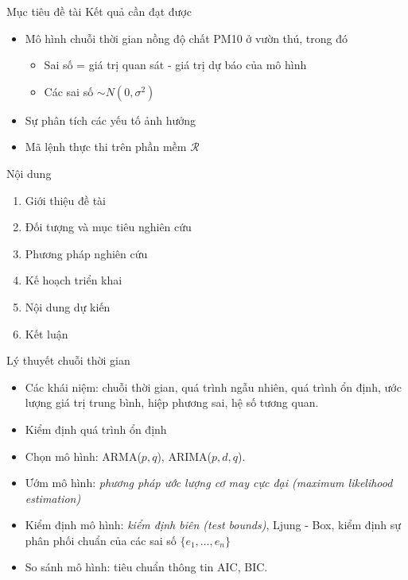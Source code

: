 \documentclass{beamer}
\begin{document}
\begin{frame}{Mục tiêu đề tài}
Kết quả cần đạt được
\begin{itemize}
\item Mô hình chuỗi thời gian nồng độ chất PM10 ở vườn thú, trong đó
	\begin{itemize}
	\item Sai số = giá trị quan sát - giá trị dự báo của mô hình
	\item Các sai số \(\sim N(0, \sigma^2)\)
	\end{itemize}
\item Sự phân tích các yếu tố ảnh hưởng
\item Mã lệnh thực thi trên phần mềm \(\mathcal{R}\)
\end{itemize}
\end{frame}

\begin{frame}{Nội dung}
\begin{enumerate}
\item Giới thiệu đề tài
\item Đối tượng và mục tiêu nghiên cứu
\item {\color{red}Phương pháp nghiên cứu}
\item Kế hoạch triển khai
\item Nội dung dự kiến
\item Kết luận
\end{enumerate}
\end{frame}

\begin{frame}{Lý thuyết chuỗi thời gian}
\begin{itemize}
\item Các khái niệm: chuỗi thời gian, quá trình ngẫu nhiên,
 quá trình ổn định, ước lượng giá trị trung bình, hiệp phương sai, hệ số tương quan.
\item Kiểm định quá trình ổn định
\item Chọn mô hình: ARMA(\(p, q\)), ARIMA(\(p, d, q\)).
\item Ướm mô hình: \textit{phương pháp ước lượng cơ may cực đại
 (maximum likelihood estimation)}
\item Kiểm định mô hình: \textit{kiểm định biên (test bounds)}, Ljung - Box,
 kiểm định sự phân phối chuẩn của các sai số \(\{e_1, \ldots, e_n\}\)
\item So sánh mô hình: tiêu chuẩn thông tin AIC, BIC.
\end{itemize}
\end{frame}
\end{document}
